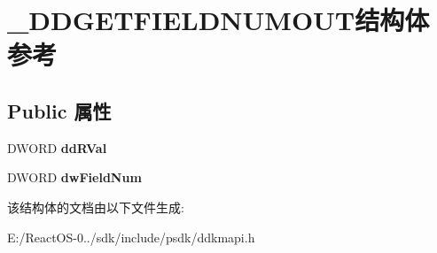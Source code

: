 \hypertarget{struct___d_d_g_e_t_f_i_e_l_d_n_u_m_o_u_t}{}\section{\+\_\+\+D\+D\+G\+E\+T\+F\+I\+E\+L\+D\+N\+U\+M\+O\+U\+T结构体 参考}
\label{struct___d_d_g_e_t_f_i_e_l_d_n_u_m_o_u_t}
\subsection*{Public 属性}
\begin{DoxyCompactItemize}
\item 
\mbox{\label{struct___d_d_g_e_t_f_i_e_l_d_n_u_m_o_u_t_a33127020e293b2986fe126ddedac484c}} 
D\+W\+O\+RD {\bfseries dd\+R\+Val}
\item 
\mbox{\label{struct___d_d_g_e_t_f_i_e_l_d_n_u_m_o_u_t_a64eef5d776b64d53208151c44c1acab5}} 
D\+W\+O\+RD {\bfseries dw\+Field\+Num}
\end{DoxyCompactItemize}


该结构体的文档由以下文件生成\+:\begin{DoxyCompactItemize}
\item 
E\+:/\+React\+O\+S-\/0../sdk/include/psdk/ddkmapi.\+h\end{DoxyCompactItemize}
